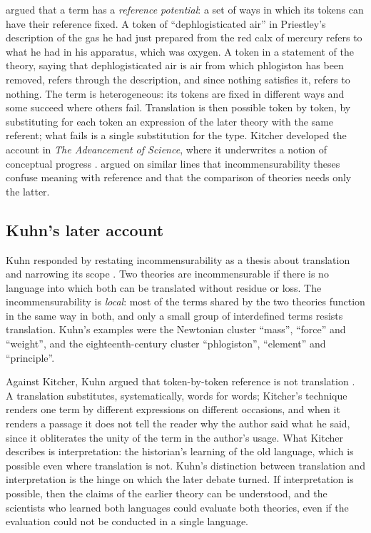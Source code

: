 \documentclass{situationist-preprint}
\begin{document}
\citet{Kitcher1978} argued that a term has a \emph{reference potential}: a set of ways in which its tokens can have their reference fixed. A token of \enquote{dephlogisticated air} in Priestley's description of the gas he had just prepared from the red calx of mercury refers to what he had in his apparatus, which was oxygen. A token in a statement of the theory, saying that dephlogisticated air is air from which phlogiston has been removed, refers through the description, and since nothing satisfies it, refers to nothing. The term is heterogeneous: its tokens are fixed in different ways and some succeed where others fail. Translation is then possible token by token, by substituting for each token an expression of the later theory with the same referent; what fails is a single substitution for the type. Kitcher developed the account in \emph{The Advancement of Science}, where it underwrites a notion of conceptual progress \citep{Kitcher1993}. \citet{Devitt1979} argued on similar lines that incommensurability theses confuse meaning with reference and that the comparison of theories needs only the latter.

\subsection{Kuhn's later account}

Kuhn responded by restating incommensurability as a thesis about translation and narrowing its scope \citep{Kuhn1983}. Two theories are incommensurable if there is no language into which both can be translated without residue or loss. The incommensurability is \emph{local}: most of the terms shared by the two theories function in the same way in both, and only a small group of interdefined terms resists translation. Kuhn's examples were the Newtonian cluster \enquote{mass}, \enquote{force} and \enquote{weight}, and the eighteenth-century cluster \enquote{phlogiston}, \enquote{element} and \enquote{principle}.

Against Kitcher, Kuhn argued that token-by-token reference is not translation \citep{Kuhn1983}. A translation substitutes, systematically, words for words; Kitcher's technique renders one term by different expressions on different occasions, and when it renders a passage it does not tell the reader why the author said what he said, since it obliterates the unity of the term in the author's usage. What Kitcher describes is interpretation: the historian's learning of the old language, which is possible even where translation is not. Kuhn's distinction between translation and interpretation is the hinge on which the later debate turned. If interpretation is possible, then the claims of the earlier theory can be understood, and the scientists who learned both languages could evaluate both theories, even if the evaluation could not be conducted in a single language.
\end{document}
